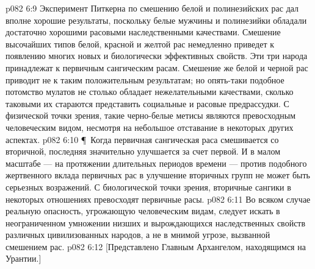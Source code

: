 \vs p082 6:9 Эксперимент Питкерна по смешению белой и полинезийских рас дал вполне хорошие результаты, поскольку белые мужчины и полинезийки обладали достаточно хорошими расовыми наследственными качествами. Смешение высочайших типов белой, красной и желтой рас немедленно приведет к появлению многих новых и биологически эффективных свойств. Эти три народа принадлежат к первичным сангическим расам. Смешение же белой и черной рас приводит не к таким положительным результатам; но опять\hyp{}таки подобное потомство мулатов не столько обладает нежелательными качествами, сколько таковыми их стараются представить социальные и расовые предрассудки. С физической точки зрения, такие черно\hyp{}белые метисы являются превосходным человеческим видом, несмотря на небольшое отставание в некоторых других аспектах.
\vs p082 6:10 \P\ Когда первичная сангическая раса смешивается со вторичной, последняя значительно улучшается за счет первой. И в малом масштабе --- на протяжении длительных периодов времени --- против подобного жертвенного вклада первичных рас в улучшение вторичных групп не может быть серьезных возражений. С биологической точки зрения, вторичные сангики в некоторых отношениях превосходят первичные расы.
\vs p082 6:11 Во всяком случае реальную опасность, угрожающую человеческим видам, следует искать в неограниченном умножении низших и вырождающихся наследственных свойств различных цивилизованных народов, а не в мнимой угрозе, вызванной смешением рас.
\vs p082 6:12 [Представлено Главным Архангелом, находящимся на Урантии.]
